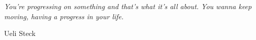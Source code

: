 \thispagestyle{empty}

\emph{
    You're progressing on something and that's what it's all about. You wanna keep moving, having a progress in your life.
}

\hfill Ueli Steck